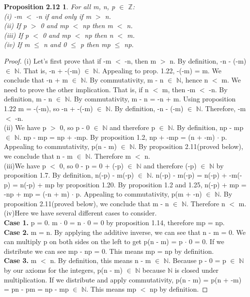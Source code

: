 \documentclass[12pt]{amsart}
\newcommand{\N}{\mathbb{N}}
\newcommand{\Z}{\mathbb{Z}}
\begin{document}
\newtheorem*{prop2.12}{Proposition 2.12}
\begin{prop2.12}
For all m, n, p $\in$ $\Z$:
\\(i) -m $<$ -n if and only if m $>$ n.
\\(ii) If p $>$ 0 and mp $<$ np then m $<$ n.
\\(iii) If p $<$ 0 and mp $<$ np then n $<$ m.
\\(iv) If m $\leq$ n and 0 $\leq$ p then mp $\leq$ np. 
\end{prop2.12}
\begin{proof}
(i) Let's first prove that if -m $<$ -n, then m $>$ n. By definition, -n - (-m) $\in$ $\N$. That is, -n + -(-m) $\in$ $\N$. Appealing to prop. 1.22, -(-m) = m. We conclude 
that -n + m $\in$ $\N$. By commutativity, m - n $\in$ $\N$, hence n $<$ m. We need to prove the other implication. That is, if n $<$ m, then -m $<$ -n. By definition, m - n $\in$ $\N$. By commutativity, m - n = -n + m. Using proposition 1.22 m = -(-m), so -n + -(-m) $\in$ $\N$. By definition, -n - (-m) $\in$ $\N$. Therefore, -m $<$ -n.
\\\indent(ii) We have p $>$ 0, so p - 0 $\in$ $\N$ and therefore p $\in$ $\N$. By definition, np - mp $\in$ $\N$. np - mp = np + -mp. By proposition 1.2, np + -mp = (n + -m) $\cdot$ p. Appealing to commutativity, p(n - m) $\in$ $\N$. By proposition 2.11(proved below), we conclude that n - m $\in$ $\N$. Therefore m $<$ n.
\\\indent(iii)We have p $<$ 0, so  0 - p = 0 + (-p) $\in$ $\N$ and therefore (-p) $\in$ $\N$ by proposition 1.7. By definition, n(-p) - m(-p) $\in$ $\N$. n(-p) - m(-p) = n(-p) + -m(-p) = n(-p) + mp by proposition 1.20. By proposition 1.2 and 1.25, n(-p) + mp = -np + mp = (-n + m) $\cdot$ p. Appealing to commutativity, p(m  + -n) $\in$ $\N$. By proposition 2.11(proved below), we conclude that m - n $\in$ $\N$. Therefore n $<$ m.
\\(iv)Here we have several different cases to consider.
\\\textbf{Case 1.} p = 0. m $\cdot$ 0 = n $\cdot$ 0 = 0 by proposition 1.14, therefore mp = np.
\\\textbf{Case 2.} m = n. By applying the additive inverse, we can see that n - m = 0. We can multiply p on both sides on the left to get p(n - m) = p $\cdot$ 0 = 0. If we distribute we can see mp - np = 0. This means mp = np by definition.
\\\textbf{Case 3.} m $<$ n. By definition, this means n - m $\in$ $\N$. Because p - 0 = p $\in$ $\N$ by our axioms for the integers, p(n - m) $\in$ $\N$ because $\N$ is closed under multiplication. If we distribute and apply commutativity, p(n - m) = p(n + -m) = pn - pm =  np - mp $\in$ $\N$. This means mp $<$ np by definition.
\end{proof}
\end{document}
